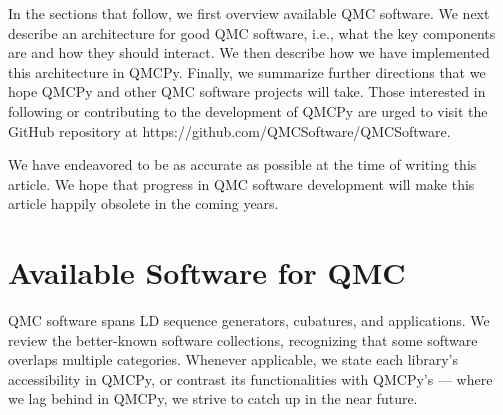 \documentclass[graybox]{svmult}
\begin{document}
In the sections that follow, we first overview available QMC software.  We next describe an architecture for good QMC software, i.e., what the key components are and how they should interact.  We then describe how we have implemented this architecture in QMCPy.  Finally, we summarize further directions that we hope QMCPy and other QMC software projects will take.  Those interested in following or contributing to the development of QMCPy are urged to visit the GitHub repository at https://github.com/QMCSoftware/QMCSoftware.


We have endeavored to be as accurate as possible at the time of writing this article.  We hope that progress in QMC software development will make this article happily obsolete in the coming years.

\section{Available Software for QMC} \label{sec:available} 
QMC software spans  LD sequence generators, cubatures, and applications.  We review the better-known software collections, recognizing that some software overlaps multiple categories. Whenever applicable, we state each library's accessibility in QMCPy, or contrast its functionalities with QMCPy's --- where we lag behind in QMCPy, we strive to catch up in the near future.
\end{document}
